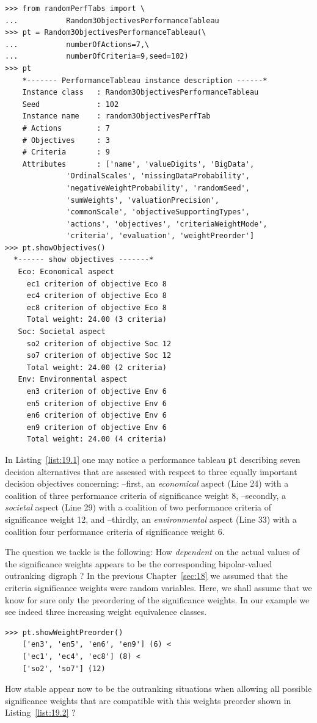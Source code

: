\begin{lstlisting}[caption={Generate a Random 3 Objectives Performance Tableau},label=list:19.1]
>>> from randomPerfTabs import \
...           Random3ObjectivesPerformanceTableau
>>> pt = Random3ObjectivesPerformanceTableau(\
...           numberOfActions=7,\
...           numberOfCriteria=9,seed=102)
>>> pt
    *------- PerformanceTableau instance description ------*
    Instance class   : Random3ObjectivesPerformanceTableau
    Seed             : 102
    Instance name    : random3ObjectivesPerfTab
    # Actions        : 7
    # Objectives     : 3
    # Criteria       : 9
    Attributes       : ['name', 'valueDigits', 'BigData',
              'OrdinalScales', 'missingDataProbability',
              'negativeWeightProbability', 'randomSeed',
              'sumWeights', 'valuationPrecision',
              'commonScale', 'objectiveSupportingTypes',
              'actions', 'objectives', 'criteriaWeightMode',
              'criteria', 'evaluation', 'weightPreorder']
>>> pt.showObjectives()
  *------ show objectives -------*
   Eco: Economical aspect
     ec1 criterion of objective Eco 8
     ec4 criterion of objective Eco 8
     ec8 criterion of objective Eco 8
     Total weight: 24.00 (3 criteria)
   Soc: Societal aspect
     so2 criterion of objective Soc 12
     so7 criterion of objective Soc 12
     Total weight: 24.00 (2 criteria)
   Env: Environmental aspect
     en3 criterion of objective Env 6
     en5 criterion of objective Env 6
     en6 criterion of objective Env 6
     en9 criterion of objective Env 6
     Total weight: 24.00 (4 criteria)
\end{lstlisting}
In Listing~\ref{list:19.1} one may notice a performance tableau \texttt{pt} describing seven decision alternatives that are assessed with respect to three equally important decision objectives concerning: --first, an \emph{economical} aspect (Line 24) with a coalition of three performance criteria of significance weight 8, --secondly, a \emph{societal} aspect (Line 29) with a coalition of two performance criteria of significance weight 12, and --thirdly, an \emph{environmental} aspect (Line 33) with a coalition four performance criteria of significance weight 6.

The question we tackle is the following: How \emph{dependent} on the actual values of the significance weights appears to be the corresponding bipolar-valued outranking digraph ? In the previous Chapter~\ref{sec:18} we assumed that the criteria significance weights were random variables. Here, we shall assume that we know for sure only the preordering of the significance weights. In our example we see indeed three increasing weight equivalence classes.
\begin{lstlisting}[caption={The significance weights preorder},label=list:19.2]
>>> pt.showWeightPreorder()
    ['en3', 'en5', 'en6', 'en9'] (6) <
    ['ec1', 'ec4', 'ec8'] (8) <
    ['so2', 'so7'] (12)
\end{lstlisting}
How stable appear now to be the outranking situations when allowing all possible significance weights that are compatible with this weights preorder shown in Listing~\ref{list:19.2} ?

